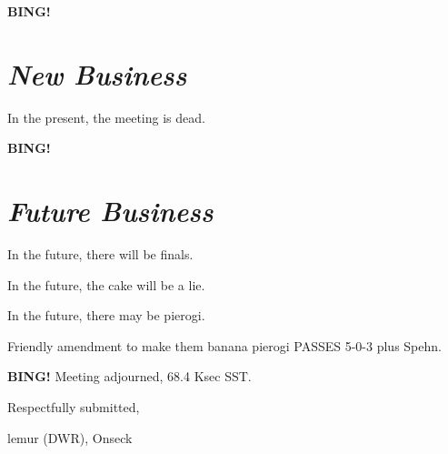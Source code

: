 \documentclass[10pt]{article}
\newcommand{\bing}{{\bf BING!} }
\newcommand{\goto}[1]{\bing \vskip 12pt \section*{{\em{#1}}}}
\newcommand{\ps}{ plus Spehn\xspace}
\newcommand{\onseck}{lemur (DWR), Onseck}
\begin{document}
\goto{New Business}

In the present, the meeting is dead.


\goto{Future Business}

In the future, there will be finals.

In the future, the cake will be a lie.

In the future, there may be pierogi.

Friendly amendment to make them banana pierogi PASSES 5-0-3\ps.


\bing
\noindent
Meeting adjourned, 68.4 Ksec SST.

\vspace{18pt}

\centerline{Respectfully submitted,}
\centerline{\onseck}
\end{document}
